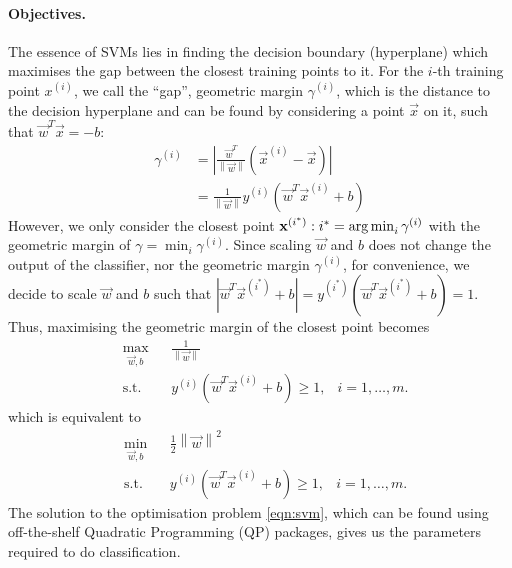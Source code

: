 \paragraph{Objectives.}
	The essence of SVMs lies in finding the decision boundary (hyperplane) which maximises the gap between the closest training points to it. For the $i$-th training point $x^{(i)}$, we call the ``gap'', geometric margin $\gamma^{(i)}$, which is the distance to the decision hyperplane and can be found by considering a point $\vec{x}$ on it, such that $\vec{w}^T\vec{x} = -b$:
	\begin{align*}
		\gamma^{(i)} 	&= \left| \frac{\vec{w}^T}{\left\| \vec{w} \right\|} \left( \vec{x}^{(i)} - \vec{x} \right) \right| \\
					&= \frac{1}{\left\| \vec{w} \right\|} y^{(i)} \left( \vec{w}^T \vec{x}^{(i)} + b \right)
	\end{align*}
However, we only consider the closest point $\boldsymbol{\mathbf{x}}^{\left( i^\ast \right)} : i^\ast = \operatorname*{arg\,min}_i{\gamma^{(i)}}$ with the geometric margin of $\gamma = \min_{i}{\gamma^{(i)}}$. Since scaling $\vec{w}$ and $b$ does not change the output of the classifier, nor the geometric margin $\gamma^{(i)}$, for convenience, we decide to scale $\vec{w}$ and $b$ such that $\left| \vec{w}^T \vec{x}^{(i^\ast)} + b \right| = y^{(i^\ast)} \left( \vec{w}^T \vec{x}^{(i^\ast)} + b \right) = 1$. Thus, maximising the geometric margin of the closest point becomes
	\begin{equation*}
	\begin{aligned}
		&\max_{\vec{w}, b} 		& & \frac{1}{\left\| \vec{w} \right\|} \\
		&\text{s.t.}				& & y^{(i)}(\vec{w}^T\vec{x}^{(i)} + b) \geq 1, &i=1,\dotsc,m.
	\end{aligned}
	\end{equation*}
which is equivalent to
	\begin{equation}
	\begin{aligned}
		&\min_{\vec{w}, b} 	& & \frac{1}{2} \left\| \vec{w} \right\|^2 \\
		&\text{s.t.}				& & y^{(i)}(\vec{w}^T\vec{x}^{(i)} + b) \geq 1, &i=1,\dotsc,m.
	\end{aligned}
	\label{eqn:svm}
	\end{equation}
The solution to the optimisation problem \eqref{eqn:svm}, which can be found using off-the-shelf Quadratic Programming (QP) packages, gives us the parameters required to do classification.

